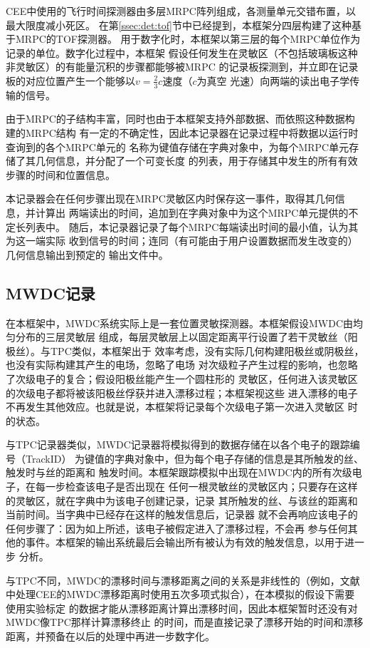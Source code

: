 \documentclass[bachelor,openany,oneside,color]{buaathesis}
\begin{document}
CEE中使用的飞行时间探测器由多层MRPC阵列组成，各测量单元交错布置，以最大限度减小死区。
在第\ref{ssec:det:tof}节中已经提到，本框架分四层构建了这种基于MRPC的TOF探测器。
用于数字化时，本框架以第三层的每个MRPC单位作为记录的单位。数字化过程中，本框架
假设任何发生在灵敏区（不包括玻璃板这种非灵敏区）的有能量沉积的步骤都能够被MRPC
的记录板探测到，并立即在记录板的对应位置产生一个能够以$v=\frac23c$速度（$c$为真空
光速）向两端的读出电子学传输的信号。

由于MRPC的子结构丰富，同时也由于本框架支持外部数据、而依照这种数据构建的MRPC结构
有一定的不确定性，因此本记录器在记录过程中将数据以运行时查询到的各个MRPC单元的
名称为键值存储在字典对象中，为每个MRPC单元存储了其几何信息，并分配了一个可变长度
的列表，用于存储其中发生的所有有效步骤的时间和位置信息。

本记录器会在任何步骤出现在MRPC灵敏区内时保存这一事件，取得其几何信息，并计算出
两端读出的时间，追加到在字典对象中为这个MRPC单元提供的不定长列表中。
随后，本记录器记录了每个MRPC每端读出时间的最小值，认为其为这一端实际
收到信号的时间；连同（有可能由于用户设置数据而发生改变的）几何信息输出到预定的
输出文件中。

\subsection{MWDC记录}\label{ssec:digi:MWDC}

在本框架中，MWDC系统实际上是一套位置灵敏探测器。本框架假设MWDC由均匀分布的三层灵敏层
组成，每层灵敏层上以固定距离平行设置了若干灵敏丝（阳极丝）。与TPC类似，本框架出于
效率考虑，没有实际几何构建阳极丝或阴极丝，也没有实际构建其产生的电场，忽略了电场
对次级粒子产生过程的影响，也忽略了次级电子的复合；假设阳极丝能产生一个圆柱形的
灵敏区，任何进入该灵敏区的次级电子都将被该阳极丝俘获并进入漂移过程；本框架视这些
进入漂移的电子不再发生其他效应。也就是说，本框架将记录每个次级电子第一次进入灵敏区
时的状态。

与TPC记录器类似，MWDC记录器将模拟得到的数据存储在以各个电子的跟踪编号（TrackID）
为键值的字典对象中，但为每个电子存储的信息是其所触发的丝、触发时与丝的距离和
触发时间。本框架跟踪模拟中出现在MWDC内的所有次级电子，在每一步检查该电子是否出现在
任何一根灵敏丝的灵敏区内；只要存在这样的灵敏区，就在字典中为该电子创建记录，记录
其所触发的丝、与该丝的距离和当前时间。当字典中已经存在这样的触发信息后，记录器
就不会再响应该电子的任何步骤了：因为如上所述，该电子被假定进入了漂移过程，不会再
参与任何其他的事件。本框架的输出系统最后会输出所有被认为有效的触发信息，以用于进一步
分析。

与TPC不同，MWDC的漂移时间与漂移距离之间的关系是非线性的（例如，文献\cite{Yi:MWDC}
中处理CEE的MWDC漂移距离时使用五次多项式拟合），在本模拟的假设下需要使用实验标定
的数据才能从漂移距离计算出漂移时间，因此本框架暂时还没有对MWDC像TPC那样计算漂移终止
的时间，而是直接记录了漂移开始的时间和漂移距离，并预备在以后的处理中再进一步数字化。
\end{document}
